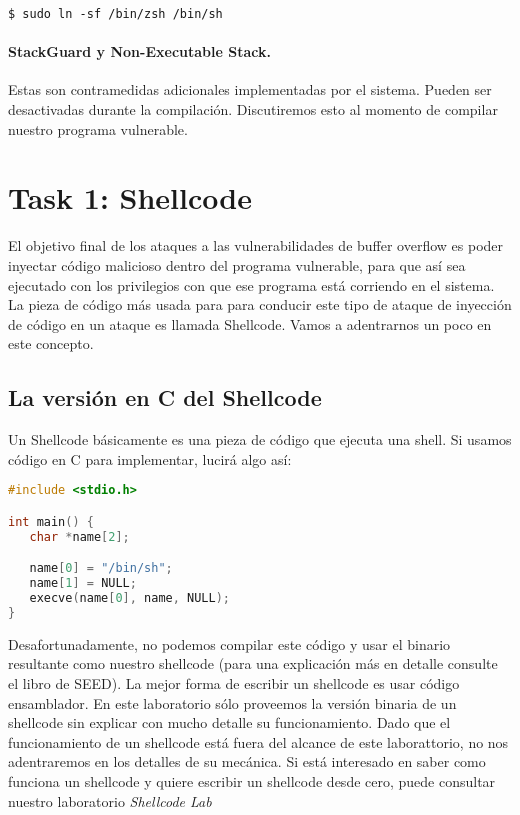 \begin{lstlisting}
$ sudo ln -sf /bin/zsh /bin/sh
\end{lstlisting}


\paragraph{StackGuard y Non-Executable Stack.} Estas son contramedidas adicionales implementadas por el sistema. Pueden ser desactivadas durante la compilación.
Discutiremos esto al momento de compilar nuestro programa vulnerable.



\section{Task 1: Shellcode}

El objetivo final de los ataques a las vulnerabilidades de buffer overflow es poder inyectar código malicioso dentro del programa vulnerable, para que así sea ejecutado con los privilegios con que ese programa está corriendo en el sistema.
La pieza de código más usada para para conducir este tipo de ataque de inyección de código en un ataque es llamada Shellcode.
Vamos a adentrarnos un poco en este concepto.


\subsection{La versión en C del Shellcode} 

Un Shellcode básicamente es una pieza de código que ejecuta una shell.
Si usamos código en C para implementar, lucirá algo así:

\begin{lstlisting}[language=C]
#include <stdio.h>

int main() {
   char *name[2];

   name[0] = "/bin/sh";
   name[1] = NULL;
   execve(name[0], name, NULL);
}
\end{lstlisting}
 
Desafortunadamente, no podemos compilar este código y usar el binario resultante como nuestro shellcode (para una explicación más en detalle consulte el libro de SEED).
La mejor forma de escribir un shellcode es usar código ensamblador.
En este laboratorio sólo proveemos la versión binaria de un shellcode sin explicar con mucho detalle su funcionamiento. Dado que el funcionamiento de un shellcode está fuera del alcance de este laborattorio, no nos adentraremos en los detalles de su mecánica.
Si está interesado en saber como funciona un shellcode y quiere escribir un shellcode desde cero, puede consultar nuestro laboratorio \textit{Shellcode Lab}


